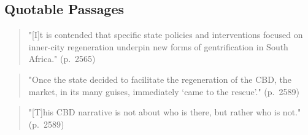 \subsection*{Quotable Passages}

\begin{quote}
"[I]t is contended that specific state policies and interventions focused on inner-city regeneration underpin new forms of gentrification in South Africa." (p.~2565)
\end{quote}

\begin{quote}
"Once the state decided to facilitate the regeneration of the CBD, the market, in its many guises, immediately `came to the rescue'." (p.~2589)
\end{quote}

\begin{quote}
"[T]his CBD narrative is not about who is there, but rather who is not." (p.~2589)
\end{quote}
